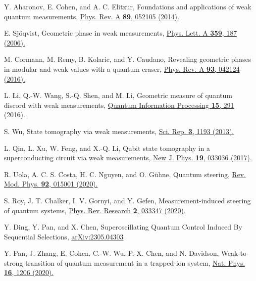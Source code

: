 \documentclass[twocolumn,pra,aps,superscriptaddress]{revtex4-2}
\begin{document}
\begin{thebibliography}{99}
 Y. Aharonov, E. Cohen, and A. C. Elitzur, Foundations and applications of weak quantum measurements, \href{https://journals.aps.org/pra/abstract/10.1103/PhysRevA.89.052105}{Phys. Rev. A \textbf{89}, 052105 (2014).}

 E. Sj\"oqvist, Geometric phase in weak measurements, \href{https://www.sciencedirect.com/science/article/abs/pii/S0375960106009169}{Phys. Lett. A \textbf{359}, 187 (2006).}

 M. Cormann, M. Remy, B. Kolaric, and Y. Caudano, Revealing geometric phases in modular and weak values with a quantum eraser, \href{https://journals.aps.org/pra/abstract/10.1103/PhysRevA.93.042124}{Phys. Rev. A \textbf{93}, 042124 (2016).}

 L. Li, Q.-W. Wang, S.-Q. Shen, and M. Li, Geometric measure of quantum discord with weak measurements, \href{https://link.springer.com/article/10.1007/s11128-015-1184-9}{Quantum Information Processing \textbf{15}, 291 (2016).}

 S. Wu, State tomography via weak measurements, \href{https://www.nature.com/articles/srep01193}{Sci. Rep. \textbf{3}, 1193 (2013).}

 L. Qin, L. Xu, W. Feng, and X.-Q. Li, Qubit state tomography in a superconducting circuit via weak measurements, \href{https://iopscience.iop.org/article/10.1088/1367-2630/aa646e}{New J. Phys. \textbf{19}, 033036 (2017).}

 R. Uola, A. C. S. Costa, H. C. Nguyen, and O. G\"uhne, Quantum steering, \href{https://journals.aps.org/rmp/abstract/10.1103/RevModPhys.92.015001}{Rev. Mod. Phys. \textbf{92}, 015001 (2020).}

 S. Roy, J. T. Chalker, I. V. Gornyi, and Y. Gefen, Measurement-induced steering of quantum systems, \href{https://journals.aps.org/prresearch/abstract/10.1103/PhysRevResearch.2.033347}{Phys. Rev. Research \textbf{2}, 033347 (2020).}

 Y. Ding, Y. Pan, and X. Chen, Superoscillating Quantum Control Induced By Sequential Selections, \href{https://arxiv.org/abs/2305.04303}{arXiv:2305.04303}

 Y. Pan, J. Zhang, E. Cohen, C.-W. Wu, P.-X. Chen, and N. Davidson, Weak-to-strong transition of quantum
measurement in a trapped-ion system, \href{https://www.nature.com/articles/s41567-020-0973-y}{Nat. Phys. \textbf{16}, 1206 (2020).}


\end{thebibliography}
\end{document}

